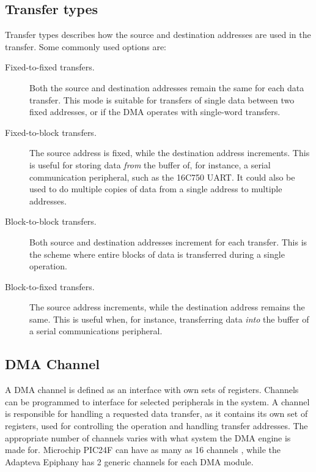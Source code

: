 \subsection{Transfer types}
Transfer types describes how the source and destination addresses are used in the transfer. \cite{microchip54}
Some commonly used options are:
\begin{description}
    \item[Fixed-to-fixed transfers.]
    Both the source and destination addresses remain the same for each data transfer.
    This mode is suitable for transfers of single data between two fixed addresses,
    or if the DMA operates with single-word transfers.
    \item[Fixed-to-block transfers.]
    The source address is fixed, while the destination address increments.
    This is useful for storing data \emph{from} the buffer of, for instance, a serial
    communication peripheral, such as the 16C750 UART.
    It could also be used to do multiple copies of data from a single address to multiple addresses.
    \item[Block-to-block transfers.]
    Both source and destination addresses increment for each transfer.
    This is the scheme where entire blocks of data is transferred during a single operation.
    \item[Block-to-fixed transfers.]
    The source address increments, while the destination address remains the same.
    This is useful when, for instance, transferring data \emph{into} the buffer of a
    serial communications peripheral.
\end{description}


\subsection{DMA Channel}
A DMA channel is defined as an interface with own sets of registers. \cite{DMAOxford}
Channels can be programmed to interface for selected peripherals in the system.
A channel is responsible for handling a requested data transfer, as it contains its own set of registers, used for controlling the operation and handling transfer addresses.
The appropriate number of channels varies with what system the DMA engine is made for.
Microchip PIC24F can have as many as 16 channels \cite{microchip54}, while the Adapteva Epiphany \cite{epiphany} has 2 generic channels for each DMA module.

